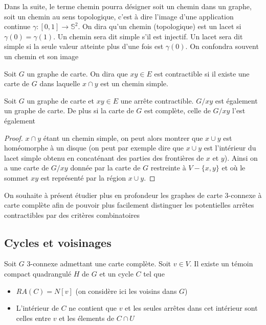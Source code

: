 \documentclass{scrartcl}
\begin{document}
\begin{flushleft}
Dans la suite, le terme chemin pourra désigner soit un chemin dans un graphe, soit un chemin au sens topologique, c'est à dire
l'image d'une application continue $\gamma : [0, 1] \rightarrow \mathbb{S}^2$. On dira qu'un chemin (topologique) est un lacet
si $\gamma(0) = \gamma(1)$. Un chemin sera dit simple s'il est injectif. Un lacet sera dit simple si la seule valeur
atteinte plus d'une fois est $\gamma(0)$. On confondra souvent un chemin et son image

\begin{def*}
    Soit $G$ un graphe de carte. On dira que $xy \in E$ est contractible si il existe une carte de $G$ dans laquelle
    $x \cap y$ est un chemin simple.
\end{def*}

\begin{prop}
    Soit $G$ un graphe de carte et $xy \in E$ une arrête contractible. $G / xy$ est également un graphe de carte.
    De plus si la carte de $G$ est complète, celle de $G / xy$ l'est également
\end{prop}

\begin{proof}
    $x \cap y$ étant un chemin simple, on peut alors montrer que $x \cup y$ est homéomorphe à un disque (on peut par
    exemple dire que $x \cup y$ est l'intérieur du lacet simple obtenu en concaténant des parties des frontières de $x$ et $y$).
    Ainsi on a une carte de $G / xy$ donnée par la carte de $G$ restreinte à $V - \{x,y\}$ et où le sommet $xy$ est représenté
    par la région $x \cup y$.
\end{proof}

On souhaite à présent étudier plus en profondeur les graphes de carte $3$-connexe à carte complète afin de pouvoir plus facilement
distinguer les potentielles arrêtes contractibles par des critères combinatoires

\subsection{Cycles et voisinages}

\begin{prop}\label{cyclSep}
    Soit $G$ $3$-connexe admettant une carte complète. Soit $v \in V$. Il existe un témoin compact quadrangulé $H$ de $G$ et
    un cycle $C$ tel que
    \begin{itemize}
        \item $RA(C) = N[v]$ (on considère ici les voisins dans $G$)
        \item L'intérieur de $C$ ne contient que $v$ et les seules arrêtes dans cet intérieur sont celles entre $v$ et
        les élements de $C \cap U$
    \end{itemize}
\end{prop}


\end{flushleft}
\end{document}
